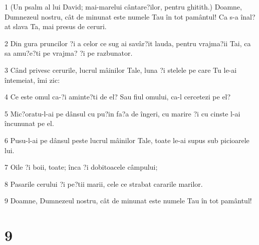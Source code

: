 \par 1 (Un psalm al lui David; mai-marelui cântare?ilor, pentru ghitith.) Doamne, Dumnezeul nostru, cât de minunat este numele Tau în tot pamântul! Ca s-a înal?at slava Ta, mai presus de ceruri.
\par 2 Din gura pruncilor ?i a celor ce sug ai savâr?it lauda, pentru vrajma?ii Tai, ca sa amu?e?ti pe vrajma? ?i pe razbunator.
\par 3 Când privesc cerurile, lucrul mâinilor Tale, luna ?i stelele pe care Tu le-ai întemeiat, îmi zic:
\par 4 Ce este omul ca-?i aminte?ti de el? Sau fiul omului, ca-l cercetezi pe el?
\par 5 Mic?oratu-l-ai pe dânsul cu pu?in fa?a de îngeri, cu marire ?i cu cinste l-ai încununat pe el.
\par 6 Pusu-l-ai pe dânsul peste lucrul mâinilor Tale, toate le-ai supus sub picioarele lui.
\par 7 Oile ?i boii, toate; înca ?i dobitoacele câmpului;
\par 8 Pasarile cerului ?i pe?tii marii, cele ce strabat cararile marilor.
\par 9 Doamne, Dumnezeul nostru, cât de minunat este numele Tau în tot pamântul!

\chapter{9}

